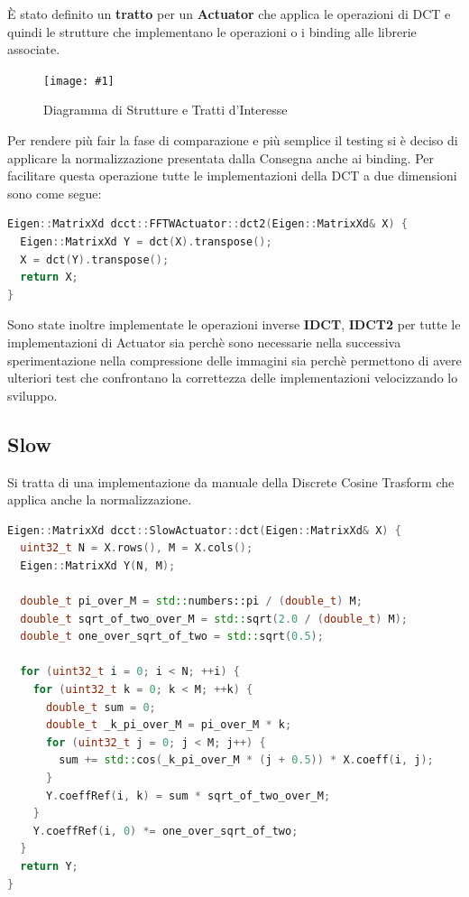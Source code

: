 \documentclass[a4paper,11pt,oneside, table]{article}
\newcommand{\putimage}[4] {
	\begin{figure}[H]
	    \centering
	    \texttt{[image: \#1]}
	    \caption{#2}\label{#3}
	\end{figure}
}
\begin{document}
\`E stato definito un \textbf{tratto} per un \textbf{Actuator} che applica le operazioni di DCT e quindi le strutture che implementano le operazioni o i binding alle librerie associate.

\putimage{images/diagram.png}{Diagramma di Strutture e Tratti d'Interesse}{png:diagram_of_structures}{0.99}

Per rendere pi\`u fair la fase di comparazione e pi\`u semplice il testing si \`e deciso di applicare la normalizzazione presentata dalla Consegna anche ai binding. Per facilitare questa operazione tutte le implementazioni della DCT a due dimensioni sono come segue:

\begin{lstlisting}[language=C++]
Eigen::MatrixXd dcct::FFTWActuator::dct2(Eigen::MatrixXd& X) {
  Eigen::MatrixXd Y = dct(X).transpose();
  X = dct(Y).transpose();
  return X;
}
\end{lstlisting}

Sono state inoltre implementate le operazioni inverse \textbf{IDCT}, \textbf{IDCT2} per tutte le implementazioni di Actuator sia perch\`e sono necessarie nella successiva sperimentazione nella compressione delle immagini sia perch\`e permettono di avere ulteriori test che confrontano la correttezza delle implementazioni velocizzando lo sviluppo.

\subsection{Slow}

Si tratta di una implementazione da manuale della Discrete Cosine Trasform che applica anche la normalizzazione.

\begin{lstlisting}[language=C++]
Eigen::MatrixXd dcct::SlowActuator::dct(Eigen::MatrixXd& X) {
  uint32_t N = X.rows(), M = X.cols();
  Eigen::MatrixXd Y(N, M);

  double_t pi_over_M = std::numbers::pi / (double_t) M;
  double_t sqrt_of_two_over_M = std::sqrt(2.0 / (double_t) M);
  double_t one_over_sqrt_of_two = std::sqrt(0.5);

  for (uint32_t i = 0; i < N; ++i) {
    for (uint32_t k = 0; k < M; ++k) {
      double_t sum = 0;
      double_t _k_pi_over_M = pi_over_M * k;
      for (uint32_t j = 0; j < M; j++) {
        sum += std::cos(_k_pi_over_M * (j + 0.5)) * X.coeff(i, j);
      }
      Y.coeffRef(i, k) = sum * sqrt_of_two_over_M;
    }
    Y.coeffRef(i, 0) *= one_over_sqrt_of_two;
  }
  return Y;
}
\end{lstlisting}
\end{document}
